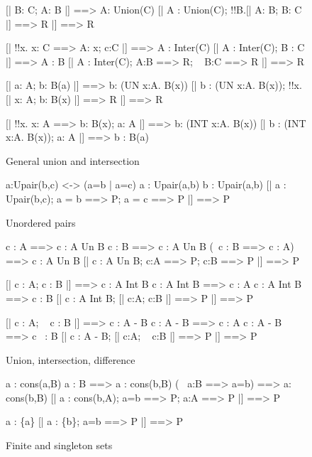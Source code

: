 \begin{figure}
\begin{ttbox}
    [| B: C;  A: B |] ==> A: Union(C)
    [| A : Union(C);  !!B.[| A: B;  B: C |] ==> R |] ==> R

    [| !!x. x: C ==> A: x;  c:C |] ==> A : Inter(C)
    [| A : Inter(C);  B : C |] ==> A : B
    [| A : Inter(C);  A:B ==> R;  ~ B:C ==> R |] ==> R

      [| a: A;  b: B(a) |] ==> b: (UN x:A. B(x))
      [| b : (UN x:A. B(x));  !!x.[| x: A;  b: B(x) |] ==> R 
          |] ==> R

     [| !!x. x: A ==> b: B(x);  a: A |] ==> b: (INT x:A. B(x))
     [| b : (INT x:A. B(x));  a: A |] ==> b : B(a)
\end{ttbox}
\caption{General union and intersection} \label{zf-lemmas3}
\end{figure}



\begin{figure}
\begin{ttbox}
      a:Upair(b,c) <-> (a=b | a=c)
      a : Upair(a,b)
      b : Upair(a,b)
       [| a : Upair(b,c);  a = b ==> P;  a = c ==> P |] ==> P
\end{ttbox}
\caption{Unordered pairs} \label{zf-upair1}
\end{figure}


\begin{figure}
\begin{ttbox}
         c : A ==> c : A Un B
         c : B ==> c : A Un B
         (~c : B ==> c : A) ==> c : A Un B
          [| c : A Un B;  c:A ==> P;  c:B ==> P |] ==> P

         [| c : A;  c : B |] ==> c : A Int B
        c : A Int B ==> c : A
        c : A Int B ==> c : B
         [| c : A Int B;  [| c:A; c:B |] ==> P |] ==> P

        [| c : A;  ~ c : B |] ==> c : A - B
       c : A - B ==> c : A
       c : A - B ==> c ~: B
        [| c : A - B;  [| c:A; ~ c:B |] ==> P |] ==> P
\end{ttbox}
\caption{Union, intersection, difference} \label{zf-Un}
\end{figure}


\begin{figure}
\begin{ttbox}
       a : cons(a,B)
       a : B ==> a : cons(b,B)
       (~ a:B ==> a=b) ==> a: cons(b,B)
        [| a : cons(b,A);  a=b ==> P;  a:A ==> P |] ==> P

   a : \{a\}
   [| a : \{b\}; a=b ==> P |] ==> P
\end{ttbox}
\caption{Finite and singleton sets} \label{zf-upair2}
\end{figure}


